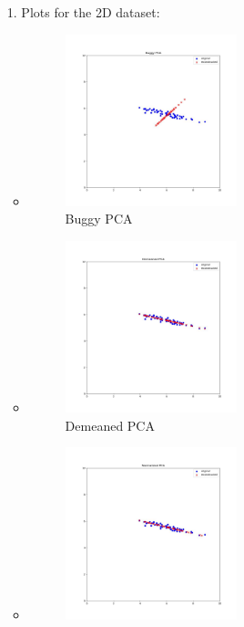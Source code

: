 \documentclass[a4paper]{article}
\theoremstyle{definition}
\newenvironment{soln}{
  \leavevmode\color{blue}\ignorespaces
}{}
\begin{document}
\begin{soln}
  \begin{itemize}
    \item [1.] Plots for the 2D dataset:
      \begin{itemize}
        \item 
          \begin{figure}[H]
            \centering
            \includegraphics[width=0.5\textwidth]{Buggy PCA.jpg}
            \caption{Buggy PCA}
            \label{fig:buggy_pca}
          \end{figure}
        \item 
          \begin{figure}[H]
            \centering
            \includegraphics[width=0.5\textwidth]{Demeaned PCA.jpg}
            \caption{Demeaned PCA}
            \label{fig:demeaned_pca}
          \end{figure}
        \item 
          \begin{figure}[H]
            \centering
            \includegraphics[width=0.5\textwidth]{Normalized PCA.jpg}

\end{figure}
\end{itemize}
\end{itemize}
\end{soln}
\end{document}
